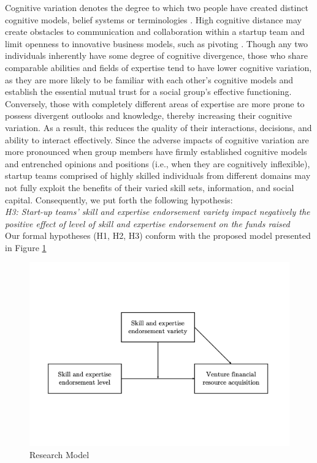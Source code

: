 \documentclass[12pt]{article}
\begin{document}
Cognitive variation denotes the degree to which two people have created distinct cognitive models, belief systems or terminologies \citep{nooteboom2007optimal}. High cognitive distance may create obstacles to communication and collaboration within a startup team and limit openness to innovative business models, such as pivoting \citep{kirtley2020pivot}. Though any two individuals inherently have some degree of cognitive divergence, those who share comparable abilities and fields of expertise tend to have lower cognitive variation, as they are more likely to be familiar with each other's cognitive models and establish the essential mutual trust for a social group's effective functioning. Conversely, those with completely different areas of expertise are more prone to possess divergent outlooks and knowledge, thereby increasing their cognitive variation. As a result, this reduces the quality of their interactions, decisions, and ability to interact effectively. Since the adverse impacts of cognitive variation are more pronounced when group members have firmly established cognitive models and entrenched opinions and positions (i.e., when they are cognitively inflexible), startup teams comprised of highly skilled individuals from different domains may not fully exploit the benefits of their varied skill sets, information, and social capital. Consequently, we put forth the following hypothesis: \\

\noindent \textit{H3: Start-up teams' skill and expertise endorsement variety impact negatively the positive effect of level of skill and expertise endorsement on the funds raised} \\

Our formal hypotheses (H1, H2, H3) conform with the proposed model presented in Figure \ref{Figure1}

\begin{figure}[!b]
  \includegraphics[width=\linewidth, scale=0.5]{model.pdf}
  \caption{Research Model}
  \label{Figure1}
\end{figure}
\end{document}
